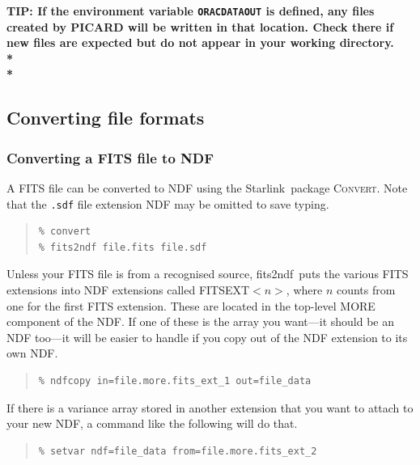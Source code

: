 \documentclass[twoside,11pt]{article}
\newcommand{\htmladdnormallink}[2]{#1}
\newcommand{\xref}[3]{#1}
\newcommand{\xlabel}[1]{}
\renewcommand{\_}{\texttt{\symbol{95}}}
\newenvironment{myquote}{
   \color{MidnightBlue}\begin{quote}\begin{small}}{
   \end{small}\end{quote}
}
\newcommand{\starlink}{\htmladdnormallink{Starlink}{http://starlink.jach.hawaii.edu}}
\newcommand{\convert}{\xref{\textsc{Convert}}{sun55}{}}
\newcommand{\task}[1]{\textsf{#1}}
\newcommand{\envvar}[1]{\texttt{#1}}
\newcommand{\file}[1]{\texttt{#1}}
\newcommand{\fitstondf}{\xref{\task{fits2ndf}}{sun55}{FITS2NDF}}
\renewenvironment{myquote}{
      \begin{quote}\begin{small}}{
      \end{small}\end{quote}
   }
\begin{document}
\begin{htmlonly}
\textbf{TIP: If the environment variable \envvar{ORAC\_DATA\_OUT} is defined,
any files created by PICARD will be written in that location. Check
there if new files are expected but do not appear in your working
directory.\\*\\*}
\end{htmlonly}


\newpage
\subsection{\xlabel{convert}Converting file formats}
\label{app:convert}

\subsubsection{\xlabel{convert}Converting a FITS file to NDF}

A FITS file can be converted to NDF using the \starlink\
package \convert. Note that the \file{.sdf} file extension NDF may
be omitted to save typing.

\begin{myquote}
\begin{verbatim}
% convert
% fits2ndf file.fits file.sdf
\end{verbatim}
\end{myquote}

Unless your FITS file is from a recognised source, \fitstondf\ puts the
various FITS extensions into NDF extensions called FITS\_EXT\_$<n>$,
where $n$ counts from one for the first FITS extension. These are
located in the top-level MORE component of the NDF. If one of these is
the array you want---it should be an NDF too---it will be easier to
handle if you copy out of the NDF extension to its own NDF.

\begin{myquote}
\begin{verbatim}
% ndfcopy in=file.more.fits_ext_1 out=file_data
\end{verbatim}
\end{myquote}

If there is a variance array stored in another extension that you want
to attach to your new NDF, a command like the following will do that.

\begin{myquote}
\begin{verbatim}
% setvar ndf=file_data from=file.more.fits_ext_2
\end{verbatim}
\end{myquote}
\end{document}
